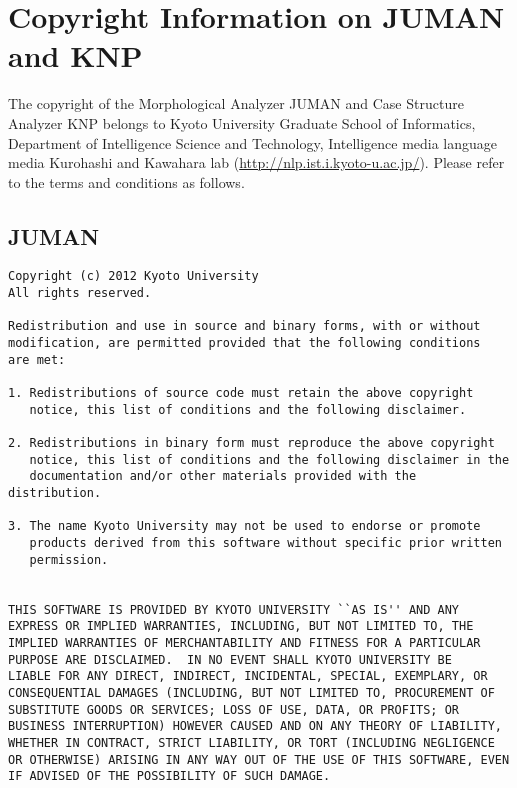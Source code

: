 
%

\section{Copyright Information on JUMAN and KNP \label{sect:copyright}}

The copyright of the Morphological Analyzer JUMAN and Case Structure Analyzer KNP belongs to Kyoto University Graduate School of Informatics, Department of Intelligence Science and Technology, Intelligence media  language media Kurohashi and Kawahara lab (\url{http://nlp.ist.i.kyoto-u.ac.jp/}). 
 Please refer to the terms and conditions as follows. 


\subsection{JUMAN}
\begin{Verbatim}[baselinestretch=0.7,frame=single]
Copyright (c) 2012 Kyoto University
All rights reserved.

Redistribution and use in source and binary forms, with or without
modification, are permitted provided that the following conditions
are met:

1. Redistributions of source code must retain the above copyright
   notice, this list of conditions and the following disclaimer.

2. Redistributions in binary form must reproduce the above copyright
   notice, this list of conditions and the following disclaimer in the
   documentation and/or other materials provided with the distribution.

3. The name Kyoto University may not be used to endorse or promote
   products derived from this software without specific prior written
   permission.


THIS SOFTWARE IS PROVIDED BY KYOTO UNIVERSITY ``AS IS'' AND ANY
EXPRESS OR IMPLIED WARRANTIES, INCLUDING, BUT NOT LIMITED TO, THE
IMPLIED WARRANTIES OF MERCHANTABILITY AND FITNESS FOR A PARTICULAR
PURPOSE ARE DISCLAIMED.  IN NO EVENT SHALL KYOTO UNIVERSITY BE
LIABLE FOR ANY DIRECT, INDIRECT, INCIDENTAL, SPECIAL, EXEMPLARY, OR
CONSEQUENTIAL DAMAGES (INCLUDING, BUT NOT LIMITED TO, PROCUREMENT OF
SUBSTITUTE GOODS OR SERVICES; LOSS OF USE, DATA, OR PROFITS; OR
BUSINESS INTERRUPTION) HOWEVER CAUSED AND ON ANY THEORY OF LIABILITY,
WHETHER IN CONTRACT, STRICT LIABILITY, OR TORT (INCLUDING NEGLIGENCE
OR OTHERWISE) ARISING IN ANY WAY OUT OF THE USE OF THIS SOFTWARE, EVEN
IF ADVISED OF THE POSSIBILITY OF SUCH DAMAGE.
\end{Verbatim}


